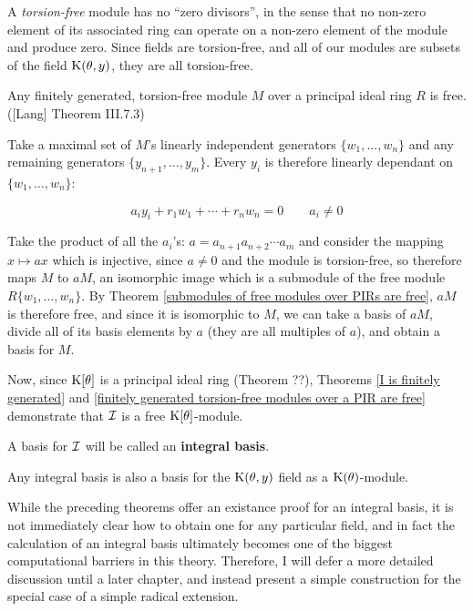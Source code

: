 \endtheorem

A {\it torsion-free} module has no ``zero divisors'', in the sense
that no non-zero element of its associated ring can operate on a
non-zero element of the module and produce zero.  Since fields are
torsion-free, and all of our modules are subsets of the field
${\rm K}(\theta,y)$, they are all torsion-free.

\theorem
\label{finitely generated torsion-free modules over a PIR are free}

Any finitely generated, torsion-free module $M$ over a principal ideal
ring $R$ is free. ([Lang] Theorem III.7.3)

\proof

Take a maximal set of $M$'s linearly independent generators $\{w_1,
\ldots, w_n\}$ and any remaining generators $\{y_{n+1}, \ldots,
y_m\}$.  Every $y_i$ is therefore linearly dependant on $\{w_1,
\ldots, w_n\}$:

$$a_i y_i + r_1 w_1 + \cdots + r_n w_n = 0 \qquad a_i \ne 0$$

Take the product of all the $a_i$'s: $a = a_{n+1} a_{n+2} \cdots a_m$
and consider the mapping $x \mapsto ax$ which is injective, since $a
\ne 0$ and the module is torsion-free, so therefore maps $M$ to $aM$,
an isomorphic image which is a submodule of the free module
$R\{w_1,\ldots,w_n\}$.  By Theorem \ref{submodules of free modules
over PIRs are free}, $aM$ is therefore free, and since it is
isomorphic to $M$, we can take a basis of $aM$, divide all of its
basis elements by $a$ (they are all multiples of $a$), and obtain
a basis for $M$.

\endtheorem

Now, since ${\rm K}[\theta]$ is a principal ideal ring (Theorem ??),
Theorems \ref{I is finitely generated} and \ref{finitely generated
torsion-free modules over a PIR are free} demonstrate that ${\cal I}$
is a free ${\rm K}[\theta]$-module.


A basis for ${\cal I}$ will be called an {\bf integral basis}.

\enddefinition

\theorem

Any integral basis is also a basis for the ${\rm K}(\theta,y)$ field as a
${\rm K}(\theta)$-module.

\endtheorem

While the preceding theorems offer an existance proof for an integral
basis, it is not immediately clear how to obtain one for any
particular field, and in fact the calculation of an integral basis
ultimately becomes one of the biggest computational barriers in this
theory.  Therefore, I will defer a more detailed discussion until a
later chapter, and instead present a simple construction for the
special case of a simple radical extension.

